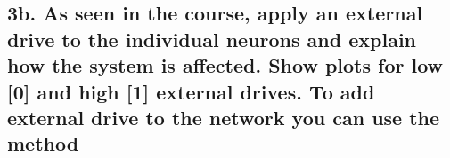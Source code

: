 \documentclass{cmc}
\begin{document}



\subsection*{3b. As seen in the course, apply an external drive to the
  individual neurons and explain how the system is affected. Show
  plots for low [0] and high [1] external drives. To add external
  drive to the network you can use the method \\
}
\label{sec:4c}


\end{document}
